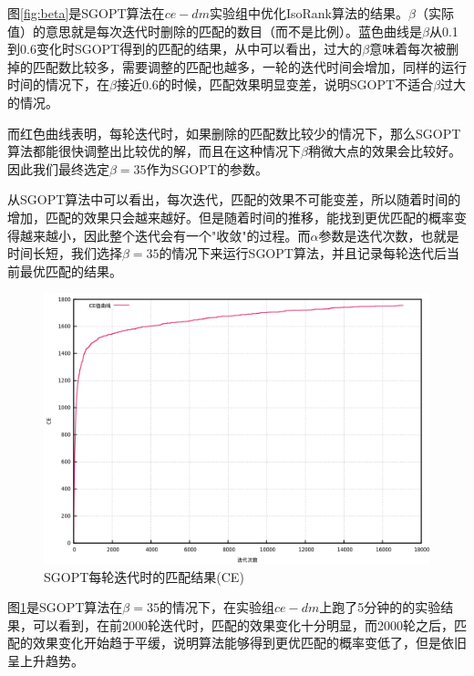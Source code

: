 图\ref{fig:beta}是SGOPT算法在$ce-dm$实验组中优化IsoRank算法的结果。$\beta$（实际值）的意思就是每次迭代时删除的匹配的数目（而不是比例）。蓝色曲线是$\beta$从0.1到0.6变化时SGOPT得到的匹配的结果，从中可以看出，过大的$\beta$意味着每次被删掉的匹配数比较多，需要调整的匹配也越多，一轮的迭代时间会增加，同样的运行时间的情况下，在$\beta$接近0.6的时候，匹配效果明显变差，说明SGOPT不适合$\beta$过大的情况。

而红色曲线表明，每轮迭代时，如果删除的匹配数比较少的情况下，那么SGOPT算法都能很快调整出比较优的解，而且在这种情况下$\beta$稍微大点的效果会比较好。因此我们最终选定$\beta=35$作为SGOPT的参数。

从SGOPT算法中可以看出，每次迭代，匹配的效果不可能变差，所以随着时间的增加，匹配的效果只会越来越好。但是随着时间的推移，能找到更优匹配的概率变得越来越小，因此整个迭代会有一个"收敛"的过程。而$\alpha$参数是迭代次数，也就是时间长短，我们选择$\beta=35$的情况下来运行SGOPT算法，并且记录每轮迭代后当前最优匹配的结果。

\begin{figure}[htbp]
\centering
\includegraphics[height=0.4\textheight]{pic/alpha.png}
\caption{SGOPT每轮迭代时的匹配结果(CE)} 
\label{fig:alpha}
\end{figure}

图\ref{fig:alpha}是SGOPT算法在$\beta=35$的情况下，在实验组$ce-dm$上跑了5分钟的的实验结果，可以看到，在前2000轮迭代时，匹配的效果变化十分明显，而2000轮之后，匹配的效果变化开始趋于平缓，说明算法能够得到更优匹配的概率变低了，但是依旧呈上升趋势。

